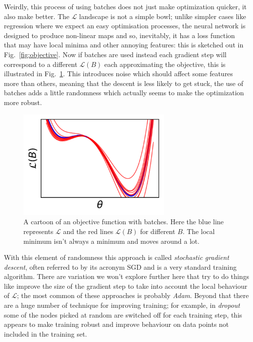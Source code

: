 \documentclass[12pt]{article}
\begin{document}
Weirdly, this process of using batches does not just make optimization
quicker, it also make better. The $\mathcal{L}$ landscape is not a
simple bowl; unlike simpler cases like regression where we expect an
easy optimisation processes, the neural network is designed to produce
non-linear maps and so, inevitably, it has a loss function that may
have local minima and other annoying features: this is sketched out in
Fig.~\ref{fig:objective}. Now if batches are used instead each
gradient step will correspond to a different $\mathcal{L}(B)$ each
approximating the objective, this is illustrated in
Fig.~\ref{fig:objective_noise}. This introduces noise which should
affect some features more than others, meaning that the descent is
less likely to get stuck, the use of batches adds a little randomness
which actually seems to make the optimization more robust.



\begin{figure}[htb]
\begin{center}
  \includegraphics[width=3in]{03.3_objective_noise.png}
\end{center}
\caption{A cartoon of an objective function with batches. Here the blue line represents $\mathcal{L}$ and the red lines $\mathcal{L}(B)$ for different $B$. The local minimum isn't always a minimum and moves around a lot.\label{fig:objective_noise}}
\end{figure}

With this element of randomness this approach is called
\textsl{stochastic gradient descent}, often referred to by its acronym
SGD and is a very standard training algorithm. There are variation we
won't explore further here that try to do things like improve the size
of the gradient step to take into account the local behaviour of
$\mathcal{L}$; the most common of these approaches is probably
\textsl{Adam}. Beyond that there are a huge number of technique for
improving training; for example, in \textsl{dropout} some of the nodes
picked at random are switched off for each training step, this appears
to make training robust and improve behaviour on data points not
included in the training set.
\end{document}
